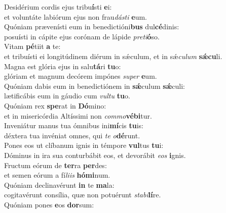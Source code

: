 \evenverse Desidérium cordis ejus tribu\textbf{í}sti \textbf{e}i:~\*\\
\evenverse et voluntáte labiórum ejus non frau\textit{dá}\textit{sti} \textbf{e}um.\\
\oddverse Quóniam prævenísti eum in benedictióni\textbf{bus} dul\textbf{cé}dinis:~\*\\
\oddverse posuísti in cápite ejus corónam de lápide \textit{pre}\textit{ti}\textbf{ó}so.\\
\evenverse Vitam \textbf{pé}tiit \textbf{a} te:~\*\\
\evenverse et tribuísti ei longitúdinem diérum in sǽculum, et in sǽ\textit{cu}\textit{lum} \textbf{sǽ}\textbf{cu}li.\\
\oddverse Magna est glória ejus in salu\textbf{tá}ri \textbf{tu}o:~\*\\
\oddverse glóriam et magnum decórem impónes \textit{su}\textit{per} \textbf{e}um.\\
\evenverse Quóniam dabis eum in benedictiónem in \textbf{sǽ}culum \textbf{sǽ}culi:~\*\\
\evenverse lætificábis eum in gáudio cum \textit{vul}\textit{tu} \textbf{tu}o.\\
\oddverse Quóniam rex \textbf{spe}rat in \textbf{Dó}mino:~\*\\
\oddverse et in misericórdia Altíssimi non \textit{com}\textit{mo}\textbf{vé}\textbf{bi}tur.\\
\evenverse Inveniátur manus tua ómnibus ini\textbf{mí}cis \textbf{tu}is:~\*\\
\evenverse déxtera tua invéniat omnes, qui \textit{te} \textit{o}\textbf{dé}runt.\\
\oddverse Pones eos ut clíbanum ignis in témpore \textbf{vul}tus \textbf{tu}i:~\*\\
\oddverse Dóminus in ira sua conturbábit eos, et devorábit \textit{e}\textit{os} \textbf{i}gnis.\\
\evenverse Fructum eórum de \textbf{ter}ra \textbf{per}des:~\*\\
\evenverse et semen eórum a fí\textit{li}\textit{is} \textbf{hó}\textbf{mi}num.\\
\oddverse Quóniam declinavérunt \textbf{in} te \textbf{ma}la:~\*\\
\oddverse cogitavérunt consília, quæ non potuérunt \textit{sta}\textit{bi}\textbf{lí}re.\\
\evenverse Quóniam pones \textbf{e}os \textbf{dor}sum:~\*\\
